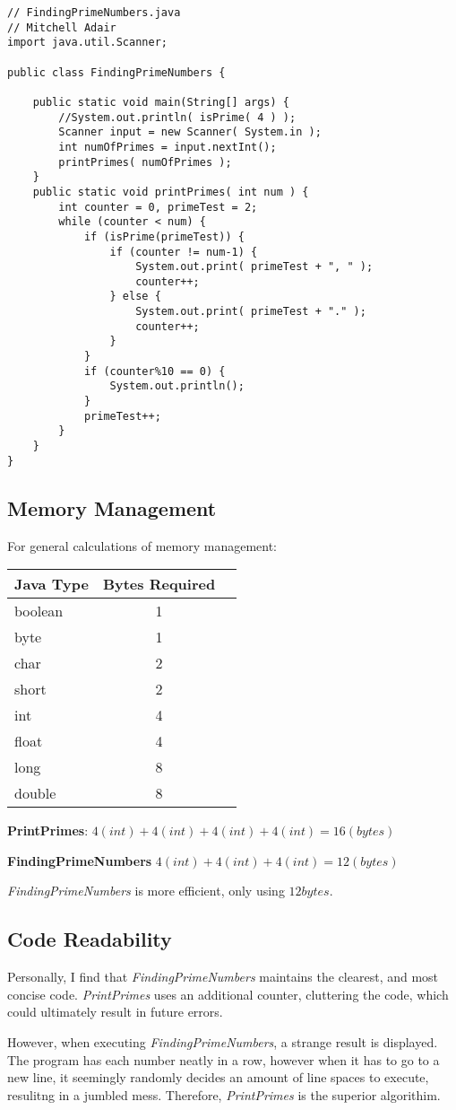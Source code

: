 \documentclass[12pt]{article}
\begin{document}
\begin{lstlisting}
// FindingPrimeNumbers.java
// Mitchell Adair
import java.util.Scanner;

public class FindingPrimeNumbers {

	public static void main(String[] args) {
		//System.out.println( isPrime( 4 ) );
		Scanner input = new Scanner( System.in );
		int numOfPrimes = input.nextInt();
		printPrimes( numOfPrimes );
	}
	public static void printPrimes( int num ) {
		int counter = 0, primeTest = 2;
		while (counter < num) {
			if (isPrime(primeTest)) {
				if (counter != num-1) {
					System.out.print( primeTest + ", " );
					counter++;
				} else {
					System.out.print( primeTest + "." );
					counter++;
				}
			}
			if (counter%10 == 0) {
				System.out.println();
			}
			primeTest++;
		}
	}
}
\end{lstlisting}
\newpage
\subsection{Memory Management}
For general calculations of memory management: 

\begin{center}
\begin{tabular}{l c r}
Java Type & Bytes Required \\ \hline \hline
boolean & 1 \\
byte & 1 \\ \hline
char & 2 \\
short & 2 \\ \hline
int & 4 \\
float & 4 \\ \hline
long & 8 \\
double & 8\\
\end{tabular}
\end{center}

\textbf{PrintPrimes}: $4(int) + 4(int) + 4(int) + 4(int) = 16(bytes)$

\textbf{FindingPrimeNumbers} $4(int) + 4(int) + 4(int) = 12(bytes)$ 

\textit{FindingPrimeNumbers} is more efficient, only using $12 bytes$.  
\subsection{Code Readability}
Personally, I find that \textit{FindingPrimeNumbers} maintains the clearest, and most concise code.  \textit{PrintPrimes} uses an additional counter, cluttering the code, which could ultimately result in future errors.

However, when executing \textit{FindingPrimeNumbers}, a strange result is displayed.  The program has each number neatly in a row, however when it has to go to a new line, it seemingly randomly decides an amount of line spaces to execute, resulitng in a jumbled mess.  Therefore, \textit{PrintPrimes} is the superior algorithim.
\end{document}
